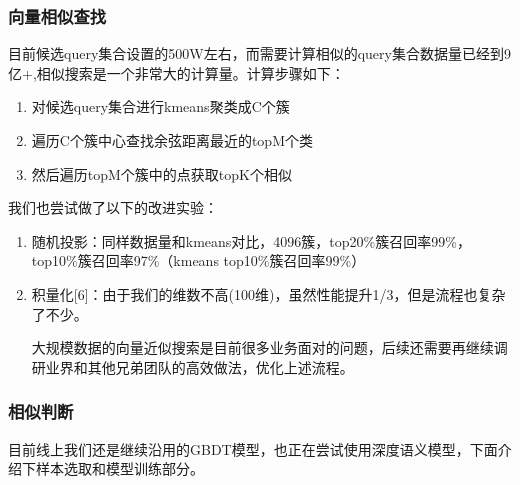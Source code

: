 \subsubsection{向量相似查找}
目前候选query集合设置的500W左右，而需要计算相似的query集合数据量已经到9亿+,相似搜索是一个非常大的计算量。计算步骤如下：
\begin{enumerate}
\item 对候选query集合进行kmeans聚类成C个簇
\item 遍历C个簇中心查找余弦距离最近的topM个类
\item 然后遍历topM个簇中的点获取topK个相似
\end{enumerate}
我们也尝试做了以下的改进实验：
\begin{enumerate}
\item 随机投影：同样数据量和kmeans对比，4096簇，top20\%簇召回率99\%，top10\%簇召回率97\%（kmeans top10\%簇召回率99\%）
\item 积量化[6]：由于我们的维数不高(100维)，虽然性能提升1/3，但是流程也复杂了不少。
\par 大规模数据的向量近似搜索是目前很多业务面对的问题，后续还需要再继续调研业界和其他兄弟团队的高效做法，优化上述流程。
\end{enumerate}

\subsubsection{相似判断}
目前线上我们还是继续沿用的GBDT模型，也正在尝试使用深度语义模型，下面介绍下样本选取和模型训练部分。

